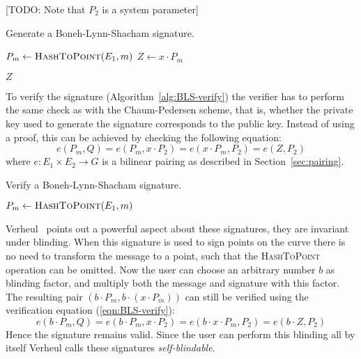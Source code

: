 [TODO: Note that $P_2$ is a system parameter]

\begin{algorithm}[t]
  \caption{Generate a Boneh-Lynn-Shacham signature.}
  \label{alg:BLS-sign}
  \addtolength{\baselineskip}{1mm}
  \begin{algorithmic}[1]
      \State $P_m \gets \Call{HashToPoint}{E_1, m}$
      \State $Z \gets x \cdot P_m$

      \Return $Z$
    \EndFunction
  \end{algorithmic}
\end{algorithm}

To verify the signature (Algorithm~\ref{alg:BLS-verify}) the verifier has to
perform the same check as with the Chaum-Pedersen scheme, that is, whether the
private key used to generate the signature corresponds to the public key.
Instead of using a proof, this can be achieved by checking the following
equation:
\begin{equation}\label{eqn:BLS-verify}
  e(P_m, Q) = e(P_m, x \cdot P_2) = e(x \cdot P_m, P_2) = e(Z, P_2)
\end{equation}
where $e: E_1 \times E_2 \to G$ is a bilinear pairing as described in
Section~\ref{sec:pairing}.

\begin{algorithm}[t]
  \caption{Verify a Boneh-Lynn-Shacham signature.}
  \label{alg:BLS-verify}
  \addtolength{\baselineskip}{1mm}
  \begin{algorithmic}[1]
      \State $P_m \gets \Call{HashToPoint}{E_1, m}$
      \Return {}
      \EndIf

      \Return {}
    \EndFunction
  \end{algorithmic}
\end{algorithm}

Verheul~\cite{Verheul01} points out a powerful aspect about these signatures,
they are invariant under blinding. When this signature is used to sign points on
the curve there is no need to transform the message to a point, such that the
\textsc{HashToPoint} operation can be omitted. Now the user can choose an
arbitrary number $b$ as blinding factor, and multiply both the message and
signature with this factor. The resulting pair
$(b \cdot P_m, b \cdot (x \cdot P_m))$ can still be verified using the
verification equation (\ref{eqn:BLS-verify}):
$$e(b \cdot P_m, Q) = e(b \cdot P_m, x \cdot P_2) =
e(b \cdot x \cdot P_m, P_2) = e(b \cdot Z, P_2)$$
Hence the signature remains valid. Since the user can perform this blinding all
by itself Verheul calls these signatures \emph{self-blindable}.

